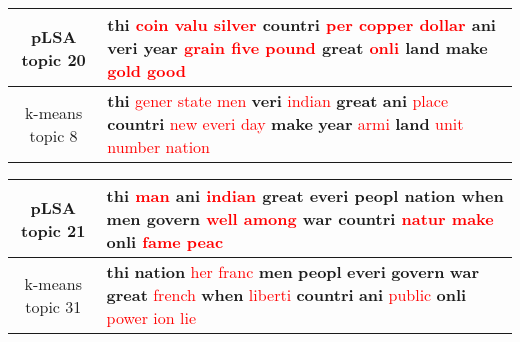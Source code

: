 \begin{center}\begin{tabularx}{\textwidth} {
  | c | >{\raggedright\arraybackslash}X | } \hline 
pLSA topic 20 & \textbf{thi} \textcolor{red}{coin} \textcolor{red}{valu} \textcolor{red}{silver} \textbf{countri} \textcolor{red}{per} \textcolor{red}{copper} \textcolor{red}{dollar} \textbf{ani} \textbf{veri} \textbf{year} \textcolor{red}{grain} \textcolor{red}{five} \textcolor{red}{pound} \textbf{great} \textcolor{red}{onli} \textbf{land} \textbf{make} \textcolor{red}{gold} \textcolor{red}{good} \\ \hline 
k-means topic 8 & \textbf{thi} \textcolor{red}{gener} \textcolor{red}{state} \textcolor{red}{men} \textbf{veri} \textcolor{red}{indian} \textbf{great} \textbf{ani} \textcolor{red}{place} \textbf{countri} \textcolor{red}{new} \textcolor{red}{everi} \textcolor{red}{day} \textbf{make} \textbf{year} \textcolor{red}{armi} \textbf{land} \textcolor{red}{unit} \textcolor{red}{number} \textcolor{red}{nation} \\ \hline 
\end{tabularx}

\end{center}

\begin{center}\begin{tabularx}{\textwidth} {
  | c | >{\raggedright\arraybackslash}X | } \hline 
pLSA topic 21 & \textbf{thi} \textcolor{red}{man} \textbf{ani} \textcolor{red}{indian} \textbf{great} \textbf{everi} \textbf{peopl} \textbf{nation} \textbf{when} \textbf{men} \textbf{govern} \textcolor{red}{well} \textcolor{red}{among} \textbf{war} \textbf{countri} \textcolor{red}{natur} \textcolor{red}{make} \textbf{onli} \textcolor{red}{fame} \textcolor{red}{peac} \\ \hline 
k-means topic 31 & \textbf{thi} \textbf{nation} \textcolor{red}{her} \textcolor{red}{franc} \textbf{men} \textbf{peopl} \textbf{everi} \textbf{govern} \textbf{war} \textbf{great} \textcolor{red}{french} \textbf{when} \textcolor{red}{liberti} \textbf{countri} \textbf{ani} \textcolor{red}{public} \textbf{onli} \textcolor{red}{power} \textcolor{red}{ion} \textcolor{red}{lie} \\ \hline 
\end{tabularx}

\end{center}

